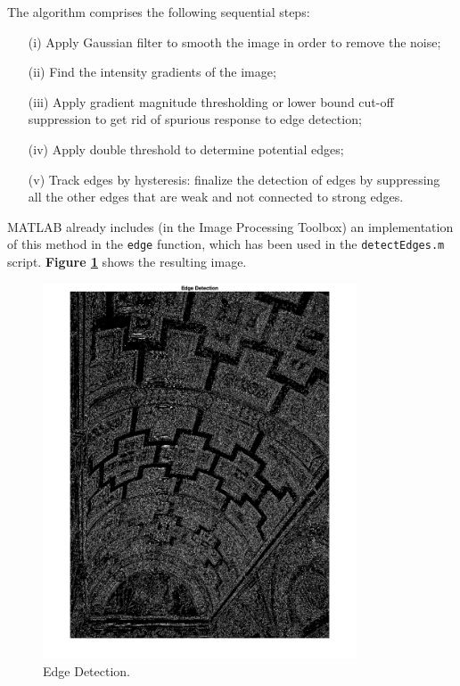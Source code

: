 \documentclass[12pt,a4paper]{article}
\begin{document}
The algorithm comprises the following sequential steps:
\begin{itemize}
    \item[(i)] Apply Gaussian filter to smooth the image in order to remove the noise;
    \item[(ii)] Find the intensity gradients of the image;
    \item[(iii)] Apply gradient magnitude thresholding or lower bound cut-off suppression to get rid of spurious response to edge detection;
    \item[(iv)] Apply double threshold to determine potential edges;
    \item[(v)] Track edges by hysteresis: finalize the detection of edges by suppressing all the other edges that are weak and not connected to strong edges.
\end{itemize}
\bigskip
MATLAB already includes (in the Image Processing Toolbox) an implementation of this method in the \verb|edge| function, which has been used in the \linebreak \verb|detectEdges.m| script. \textbf{Figure \ref{fig:edges}} shows the resulting image.

\begin{figure}[H]
    \centering
    \includegraphics[width=0.83\textwidth]{Images/PalazzoTe_edges.png}
    \caption[Edge Detection.]{Edge Detection.}
    \label{fig:edges}
\end{figure}
\end{document}
